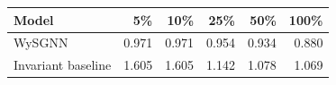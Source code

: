 \begin{tabular}{lrrrrr}
\toprule
Model & 5\% & 10\% & 25\% & 50\% & 100\% \\
\midrule
WySGNN & 0.971 & 0.971 & 0.954 & 0.934 & 0.880 \\
Invariant baseline & 1.605 & 1.605 & 1.142 & 1.078 & 1.069 \\
\bottomrule
\end{tabular}
